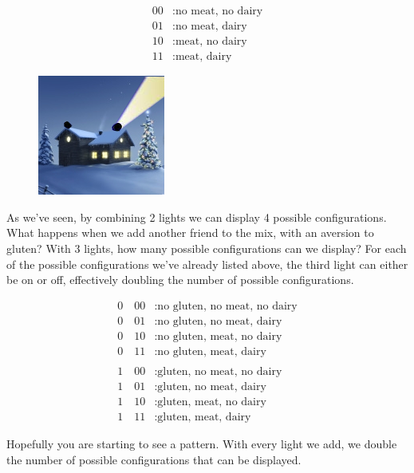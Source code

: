 \documentclass[UTF8]{book}
\begin{document}
\begin{CJK}{UTF8}{gbsn}
\begin{align*}
	00&: \text{no meat, no dairy} \\
	01&: \text{no meat, dairy} \\
	10&: \text{meat, no dairy} \\
	11&: \text{meat, dairy}
\end{align*}

\begin{figure}[H]
\captionsetup{labelformat=empty}
\centering
\includegraphics[width=0.25\linewidth]{house_on_hill_01}
\end{figure}

As we've seen, by combining 2 lights we can display 4 possible configurations. What happens when we add another friend to the mix, with an aversion to gluten? With 3 lights, how many possible configurations can we display? For each of the possible configurations we've already listed above, the third light can either be on or off, effectively doubling the number of possible configurations.

\begin{align*}
	0\quad00&: \text{no gluten, no meat, no dairy} \\
	0\quad 01&: \text{no gluten, no meat, dairy} \\
	0\quad 10&: \text{no gluten, meat, no dairy} \\
	0\quad 11&: \text{no gluten, meat, dairy} \\
          \\
	1\quad 00&: \text{gluten, no meat, no dairy} \\
	1\quad 01&: \text{gluten, no meat, dairy} \\
	1\quad 10&: \text{gluten, meat, no dairy} \\
	1\quad 11&: \text{gluten, meat, dairy}
\end{align*}

Hopefully you are starting to see a pattern. With every light we add, we double the number of possible configurations that can be displayed.


\end{CJK}
\end{document}

